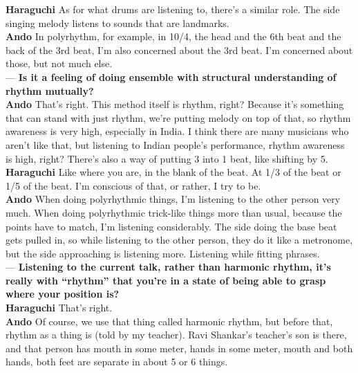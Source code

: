 \begin{description}
{\bf Haraguchi} As for what drums are listening to, there's a similar role. The side singing melody listens to sounds that are landmarks.\\

{\bf Ando} In polyrhythm, for example, in 10/4, the head and the 6th beat and the back of the 3rd beat, I'm also concerned about the 3rd beat. I'm concerned about those, but not much else.\\

--- {\bf Is it a feeling of doing ensemble with structural understanding of rhythm mutually?}\\

{\bf Ando} That's right. This method itself is rhythm, right? Because it's something that can stand with just rhythm, we're putting melody on top of that, so rhythm awareness is very high, especially in India. I think there are many musicians who aren't like that, but listening to Indian people's performance, rhythm awareness is high, right? There's also a way of putting 3 into 1 beat, like shifting by 5.\\

{\bf Haraguchi} Like where you are, in the blank of the beat. At 1/3 of the beat or 1/5 of the beat. I'm conscious of that, or rather, I try to be.\\

{\bf Ando} When doing polyrhythmic things, I'm listening to the other person very much. When doing polyrhythmic trick-like things more than usual, because the points have to match, I'm listening considerably. The side doing the base beat gets pulled in, so while listening to the other person, they do it like a metronome, but the side approaching is listening more. Listening while fitting phrases.\\

--- {\bf Listening to the current talk, rather than harmonic rhythm, it's really with ``rhythm'' that you're in a state of being able to grasp where your position is?}\\

{\bf Haraguchi} That's right.\\

{\bf Ando} Of course, we use that thing called harmonic rhythm, but before that, rhythm as a thing is (told by my teacher). Ravi Shankar's teacher's son is there, and that person has mouth in some meter, hands in some meter, mouth and both hands, both feet are separate in about 5 or 6 things.\\


\end{description}
